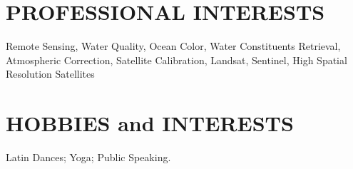 \documentclass[11pt]{res}
\begin{document}
\begin{resume}
\vspace{-0.1in}
\section{PROFESSIONAL INTERESTS}
\vspace{0.1in}
Remote Sensing, Water Quality, Ocean Color, Water Constituents Retrieval, Atmospheric Correction, Satellite Calibration, Landsat, Sentinel, High Spatial Resolution Satellites\\

\vspace{-0.1in}
\section{HOBBIES and INTERESTS}
\vspace{0.1in}
Latin Dances; Yoga; Public Speaking.


\end{resume}
\end{document}
